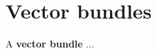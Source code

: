 \section{Vector bundles}

\begin{definition}
A \textbf{vector bundle} ...
\end{definition}

\begin{example}
\end{example}